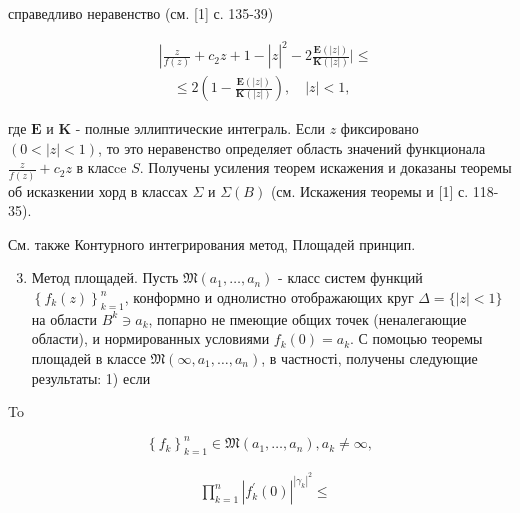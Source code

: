 \documentclass[10pt]{article}
\begin{document}
справедливо неравенство (см. [1] с. 135-39)



\[

\begin{aligned}

& \left.\left|\frac{z}{f(z)}+c_{2} z+1-\right| z\right|^{2}-2 \frac{\boldsymbol{E}(|z|)}{\boldsymbol{K}(|z|)} \mid \leqslant \\

& \quad \leqslant 2\left(1-\frac{\boldsymbol{E}(|z|)}{\boldsymbol{K}(|z|)}\right), \quad|z|<1,

\end{aligned}

\]



где $\boldsymbol{E}$ и $\boldsymbol{K}$ - полные эллиптические интеграль. Если $z$ фиксировано $(0<|z|<1)$, то это неравенство определяет область значений функционала $\frac{z}{f(z)}+c_{2} z$ в класce $S$. Получены усиления теорем искажения и доказаны теоремы об исказкении хорд в классах $\Sigma$ и $\Sigma(B)$ (см. Искажения теоремы и [1] с. 118-35).



См. также Контурного интегрирования метод, Площадей принцип.



\begin{enumerate}

  \setcounter{enumi}{2}

  \item Метод площадей. Пусть $\mathfrak{M}\left(a_{1}, \ldots, a_{n}\right)$ - класс систем функций $\left\{f_{k}(z)\right\}_{k=1}^{n}$, конформно и однолистно отображающих круг $\Delta=\{|z|<1\}$ на области $B^{k} \ni a_{k}$, попарно не пмеющие общих точек (неналегающие области), и нормированных условиями $f_{k}(0)=a_{k}$. С помоцью теоремы площадей в классе $\mathfrak{M}\left(\infty, a_{1}, \ldots, a_{n}\right)$, в частності, получены следующие результаты: 1) если

\end{enumerate}



To



\[

\left\{f_{k}\right\}_{k=1}^{n} \in \mathfrak{M}\left(a_{1}, \ldots, a_{n}\right), a_{k} \neq \infty,

\]



\[

\begin{aligned}

& \prod_{k=1}^{n}\left|f_{k}^{\prime}(0)\right|^{\left|\gamma_{k}\right|^{2}} \leqslant

\end{aligned}

\]
\end{document}
